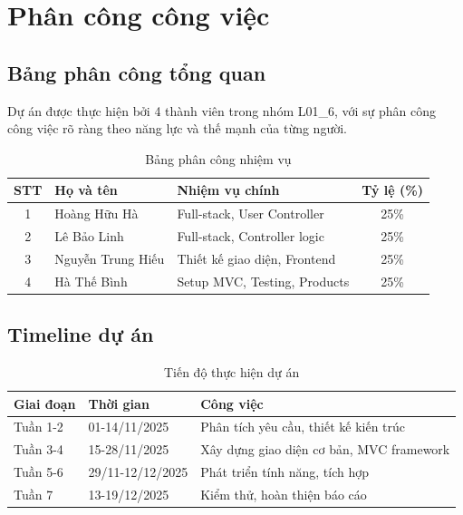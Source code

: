 
\section{Phân công công việc}

\subsection{Bảng phân công tổng quan}

Dự án được thực hiện bởi 4 thành viên trong nhóm L01\_6, với sự phân công công việc rõ ràng theo năng lực và thế mạnh của từng người.

\begin{table}[H]
\centering
\begin{tabular}{|c|l|l|c|}
\hline
\textbf{STT} & \textbf{Họ và tên} & \textbf{Nhiệm vụ chính} & \textbf{Tỷ lệ (\%)} \\
\hline
1 & Hoàng Hữu Hà & Full-stack, User Controller & 25\% \\
\hline
2 & Lê Bảo Linh & Full-stack, Controller logic & 25\% \\
\hline
3 & Nguyễn Trung Hiếu & Thiết kế giao diện, Frontend & 25\% \\
\hline
4 & Hà Thế Bình & Setup MVC, Testing, Products & 25\% \\
\hline
\end{tabular}
\caption{Bảng phân công nhiệm vụ}
\label{tab:task-assignment}
\end{table}

\subsection{Timeline dự án}

\begin{table}[H]
\centering
\begin{tabular}{|l|l|l|}
\hline
\textbf{Giai đoạn} & \textbf{Thời gian} & \textbf{Công việc} \\
\hline
Tuần 1-2 & 01-14/11/2025 & Phân tích yêu cầu, thiết kế kiến trúc \\
\hline
Tuần 3-4 & 15-28/11/2025 & Xây dựng giao diện cơ bản, MVC framework \\
\hline
Tuần 5-6 & 29/11-12/12/2025 & Phát triển tính năng, tích hợp \\
\hline
Tuần 7 & 13-19/12/2025 & Kiểm thử, hoàn thiện báo cáo \\
\hline
\end{tabular}
\caption{Tiến độ thực hiện dự án}
\label{tab:timeline}
\end{table}

